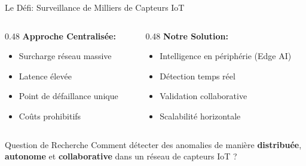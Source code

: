 \documentclass[aspectratio=169]{beamer}
\begin{document}
\begin{frame}{Le Défi: Surveillance de Milliers de Capteurs IoT}
    \begin{columns}[T]
        \begin{column}{0.48\textwidth}
            \textbf{Approche Centralisée:}
            \begin{itemize}
                \item[$-$] Surcharge réseau massive
                \item[$-$] Latence élevée
                \item[$-$] Point de défaillance unique
                \item[$-$] Coûts prohibitifs
            \end{itemize}
        \end{column}
        
        \begin{column}{0.48\textwidth}
            \textbf{Notre Solution:}
            \begin{itemize}
                \item[$+$] Intelligence en périphérie (Edge AI)
                \item[$+$] Détection temps réel
                \item[$+$] Validation collaborative
                \item[$+$] Scalabilité horizontale
            \end{itemize}
        \end{column}
    \end{columns}
    
    \vspace{0.5cm}
    
    \begin{alertblock}{Question de Recherche}
        Comment détecter des anomalies de manière \textbf{distribuée}, \textbf{autonome} et \textbf{collaborative} dans un réseau de capteurs IoT ?
    \end{alertblock}
\end{frame}
\end{document}
